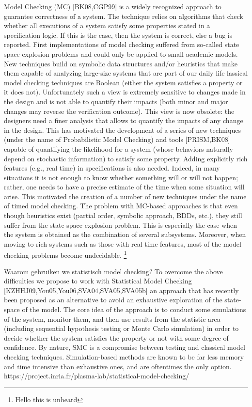Model Checking (MC) [BK08,CGP99] is a widely recognized approach to guarantee correctness of a system. The technique relies on algorithms that check whether all executions of a system satisfy some properties stated in a specification logic. If this is the case, then the system is correct, else a bug is reported.
First implementations of model checking suffered from so-called state space explosion problems and could only be applied to small academic models. New techniques build on symbolic data structures and/or heuristics that make them capable of analyzing large-size systems that are part of our daily life
lassical model checking techniques are Boolean (either the system satisfies a property or it does not). Unfortunately such a view is extremely sensitive to changes made in the design and is not able to quantify their impacts (both minor and major changes may reverse the verification outcome).  This view is now obsolete: the designers need a finer analysis that allows to quantify the impacts of any change in the design. This has motivated the development of a series of new techniques (under the name of Probabilistic Model Checking) and tools [PRISM,BK08] capable of quantifying the likelihood for a system (whose behaviors naturally depend on stochastic information) to satisfy some property.  Adding explicitly rich features (e.g., real time) in specifications is also needed. Indeed, in many situations it is not enough to know whether something will or will not happen; rather, one needs to have a precise estimate of the time when some situation will arise. This motivated the creation of a number of new techniques under the name of timed model checking. 
The problem with MC-based approaches is that even though heuristics exist (partial order, symbolic approach, BDDs, etc.), they still suffer from the state-space explosion problem. This is especially the case when the system is obtained as the combination of several subsystems. Moreover, when moving to rich systems such as those with real time features, most of the model checking problems become undecidable.
\footnote{Hello this is unheard}
\cite{inriaStatsMoodCheck}
\cite{ buddeModelChecker}
\cite{AGHASuervey }


Waarom gebruiken we statistisch model checking?
To overcome the above difficulties we propose to work with Statistical Model Checking [KZHHJ09,You05,You06,SVA04,SVA05,SVA05b] an approach that has recently been proposed as an alternative to avoid an exhaustive exploration of the state-space of the model. The core idea of the approach is to conduct some simulations of the system, monitor them, and then use results from the statistic area (including sequential hypothesis testing or Monte Carlo simulation) in order to decide whether the system satisfies the property or not with some degree of confidence. By nature, SMC is a compromise between testing and classical model checking techniques. Simulation-based methods are known to be far less memory and time intensive than exhaustive ones, and are oftentimes the only option. 
https://project.inria.fr/plasma-lab/statistical-model-checking/

